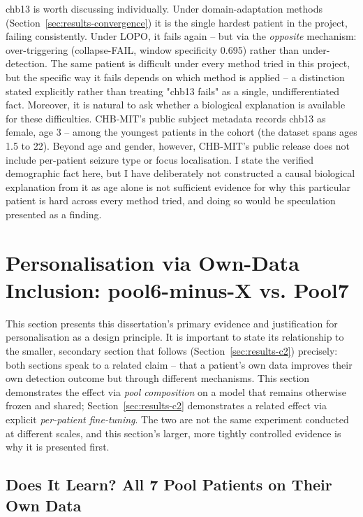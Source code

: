 chb13 is worth discussing individually. Under domain-adaptation methods (Section~\ref{sec:results-convergence}) it is the single hardest patient in the project, failing consistently. Under LOPO, it fails again -- but via the \emph{opposite} mechanism: over-triggering (collapse-FAIL, window specificity 0.695) rather than under-detection. The same patient is difficult under every method tried in this project, but the specific way it fails depends on which method is applied -- 
a distinction stated explicitly rather than treating "chb13 fails" as a single, undifferentiated fact. 
Moreover, it is natural to ask whether a biological explanation is available for these difficulties. CHB-MIT's public subject metadata \citep{chbmit_subject_info} records chb13 as female, age 3 -- among the youngest patients in the cohort (the dataset spans ages 1.5 to 22). Beyond age and gender, however, CHB-MIT's public release does not include per-patient seizure type or focus localisation. I state the verified demographic fact here, but I have deliberately not constructed a causal biological explanation from it as age alone is not sufficient evidence for why this particular patient is hard across every method tried, and doing so would be speculation presented as a finding.

\section{Personalisation via Own-Data Inclusion: pool6-minus-X vs. Pool7}
\label{sec:results-owndata}

This section presents this dissertation's primary evidence and justification for personalisation as a design principle. It is important to state its relationship to the smaller, 
secondary section that follows (Section~\ref{sec:results-c2}) precisely: both sections speak to a related claim -- that a patient's own data improves their own detection outcome 
but through different mechanisms. This section demonstrates the effect via \emph{pool composition} on a model that remains otherwise frozen and shared; Section~\ref{sec:results-c2} 
demonstrates a related effect via explicit \emph{per-patient fine-tuning}. The two are not the same experiment conducted at different scales, and this section's larger, more tightly 
controlled evidence is why it is presented first.

\subsection{Does It Learn? All 7 Pool Patients on Their Own Data}

